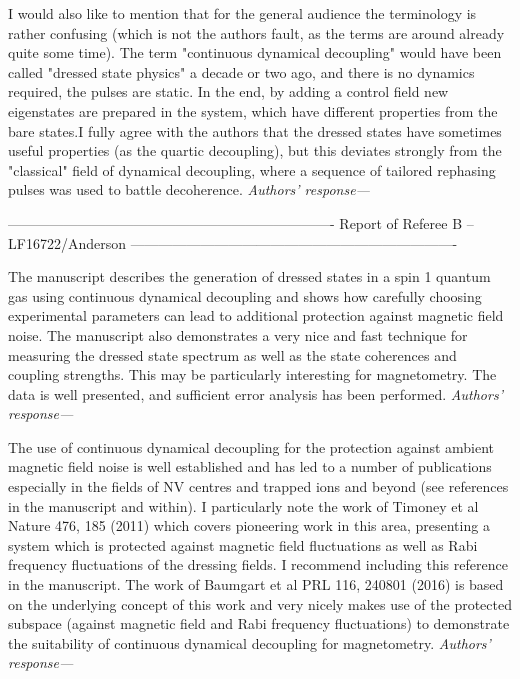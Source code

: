 \documentclass[letterpaper]{article}
\newenvironment{refcomment}{\singlespacing\verbatim}{\endverbatim}
\newcommand{\response}{\emph{Authors' response---}}
\begin{document}
\begin{refcomment}
I would also like to mention that for the general audience the
terminology is rather confusing (which is not the authors fault, as
the terms are around already quite some time). The term "continuous
dynamical decoupling" would have been called "dressed state physics" a
decade or two ago, and there is no dynamics required, the pulses are
static. In the end, by adding a control field new eigenstates are
prepared in the system, which have different properties from the bare
states.I fully agree with the authors that the dressed states have
sometimes useful properties (as the quartic decoupling), but this
deviates strongly from the "classical" field of dynamical decoupling,
where a sequence of tailored rephasing pulses was used to battle
decoherence.
\end{refcomment}
\response 


\newpage
\begin{refcomment}
----------------------------------------------------------------------
Report of Referee B -- LF16722/Anderson
----------------------------------------------------------------------

The manuscript describes the generation of dressed states in a spin 1 
quantum gas using continuous dynamical decoupling and shows how 
carefully choosing experimental parameters can lead to
additional protection against magnetic field noise. The manuscript 
also demonstrates a very nice and fast technique for measuring the 
dressed state spectrum as well as the state coherences and coupling 
strengths. This may be particularly interesting for magnetometry. The 
data is well presented, and sufficient error analysis has been 
performed.
\end{refcomment}
\response 


\begin{refcomment}
The use of continuous dynamical decoupling for the protection against 
ambient magnetic field noise is well established and has led to a 
number of publications especially in the fields of NV centres and 
trapped ions and beyond (see references in the manuscript and within).
I particularly note the work of Timoney et al Nature 476, 185 (2011) 
which covers pioneering work in this area, presenting a system which 
is protected against magnetic field fluctuations as well as Rabi 
frequency fluctuations of the dressing fields. I recommend including 
this reference in the manuscript. The work of Baumgart et al PRL 116, 
240801 (2016) is based on the underlying concept of this work and very
nicely makes use of the protected subspace (against magnetic field and
Rabi frequency fluctuations) to demonstrate the suitability of 
continuous dynamical decoupling for magnetometry.
\end{refcomment}
\response 
\end{document}
